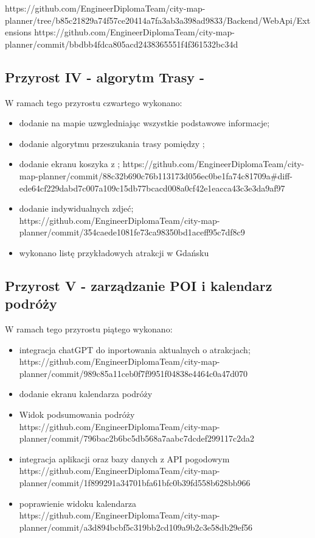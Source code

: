     https://github.com/EngineerDiplomaTeam/city-map-planner/tree/b85c21829a74f57ce20414a7fa3ab3a398ad9833/Backend/WebApi/Extensions
    https://github.com/EngineerDiplomaTeam/city-map-planner/commit/bbdbb4fdca805acd2438365551f4f361532bc34d


    \subsection{Przyrost IV - algorytm Trasy - }
    \label{sec:przyrost4}

    W ramach tego przyrostu czwartego wykonano:
    \begin{itemize}
        \item dodanie  na mapie uzwgledniając wszystkie podstawowe informacje;
        \item dodanie algorytmu przeszukania trasy pomiędzy ;
        \item dodanie ekranu koszyka z ;
        https://github.com/EngineerDiplomaTeam/city-map-planner/commit/88c32b690c76b113173d056ec0be1fa74c81709a#diff-ede64cf229dabd7c007a109c15db77bcacd008a0cf42e1eacca43c3e3da9af97
        \item dodanie indywidualnych zdjeć;
        https://github.com/EngineerDiplomaTeam/city-map-planner/commit/354caede1081fe73ca98350bd1aceff95c7df8c9
        \item wykonano listę przykładowych atrakcji w Gdańsku
    \end{itemize}


    \subsection{Przyrost V - zarządzanie POI i kalendarz podróży}
    \label{sec:przyrost5}

    W ramach tego przyrostu piątego wykonano:
    \begin{itemize}
        \item integracja chatGPT do inportowania aktualnych o atrakcjach;
        https://github.com/EngineerDiplomaTeam/city-map-planner/commit/989c85a11ceb0f7f9951f04838e4464c0a47d070
        \item dodanie ekranu kalendarza podróży
        \item Widok podsumowania podróży
        https://github.com/EngineerDiplomaTeam/city-map-planner/commit/796bac2b6bc5db568a7aabc7dcdef299117c2da2
        \item integracja aplikacji oraz bazy danych z API pogodowym
        https://github.com/EngineerDiplomaTeam/city-map-planner/commit/1f899291a34701bfa61bfc0b39fd558b628bb966
        \item poprawienie widoku kalendarza
        https://github.com/EngineerDiplomaTeam/city-map-planner/commit/a3d894bcbf5c319bb2cd109a9b2c3e58db29ef56
    \end{itemize}

